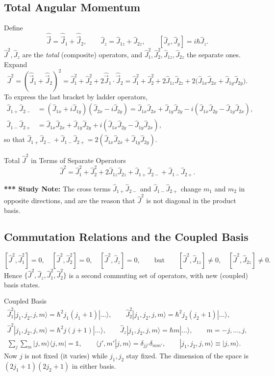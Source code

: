 \documentclass[11pt,a4paper]{article}
\begin{document}
\subsection{Total Angular Momentum}
Define
\[
\hat{\vec J}=\hat{\vec J}_1+\hat{\vec J}_2,\qquad \hat J_z=\hat J_{1z}+\hat J_{2z},\qquad [\hat J_x,\hat J_y]=i\hbar\hat J_z .
\]
$\hat J^2,\hat J_z$ are the \emph{total} (composite) operators, and $\hat J_1^2,\hat J_2^2,\hat J_{1z},\hat J_{2z}$ the separate ones. Expand
\[
\hat J^2=(\hat{\vec J}_1+\hat{\vec J}_2)^2=\hat J_1^2+\hat J_2^2+2\hat{\vec J}_1\cdot\hat{\vec J}_2=\hat J_1^2+\hat J_2^2+2\hat J_{1z}\hat J_{2z}+2\big(\hat J_{1x}\hat J_{2x}+\hat J_{1y}\hat J_{2y}\big).
\]
To express the last bracket by ladder operators,
\begin{align*}
\hat J_{1+}\hat J_{2-}&=(\hat J_{1x}+i\hat J_{1y})(\hat J_{2x}-i\hat J_{2y})=\hat J_{1x}\hat J_{2x}+\hat J_{1y}\hat J_{2y}-i(\hat J_{1x}\hat J_{2y}-\hat J_{1y}\hat J_{2x}),\\
\hat J_{1-}\hat J_{2+}&=\hat J_{1x}\hat J_{2x}+\hat J_{1y}\hat J_{2y}+i(\hat J_{1x}\hat J_{2y}-\hat J_{1y}\hat J_{2x}),
\end{align*}
so that $\hat J_{1+}\hat J_{2-}+\hat J_{1-}\hat J_{2+}=2(\hat J_{1x}\hat J_{2x}+\hat J_{1y}\hat J_{2y})$.

\begin{thm}{Total $\hat J^2$ in Terms of Separate Operators}
\[
\hat J^2=\hat J_1^2+\hat J_2^2+2\hat J_{1z}\hat J_{2z}+\hat J_{1+}\hat J_{2-}+\hat J_{1-}\hat J_{2+}.
\]
\end{thm}

\textbf{*** Study Note:} The cross terms $\hat J_{1+}\hat J_{2-}$ and $\hat J_{1-}\hat J_{2+}$ change $m_1$ and $m_2$ in opposite directions, and are the reason that $\hat J^2$ is not diagonal in the product basis.

\subsection{Commutation Relations and the Coupled Basis}
\[
[\hat J^2,\hat J_1^2]=0,\quad[\hat J^2,\hat J_2^2]=0,\quad[\hat J^2,\hat J_z]=0,\qquad\text{but}\qquad [\hat J^2,\hat J_{1z}]\neq0,\quad[\hat J^2,\hat J_{2z}]\neq0 .
\]
Hence $\{\hat J^2,\hat J_z,\hat J_1^2,\hat J_2^2\}$ is a second commuting set of operators, with new (coupled) basis states.

\begin{thm}{Coupled Basis}
\begin{gather*}
\hat J_1^2|j_1,j_2,j,m\rangle=\hbar^2j_1(j_1+1)|\dots\rangle,\qquad \hat J_2^2|j_1,j_2,j,m\rangle=\hbar^2j_2(j_2+1)|\dots\rangle,\\
\hat J^2|j_1,j_2,j,m\rangle=\hbar^2j(j+1)|\dots\rangle,\qquad \hat J_z|j_1,j_2,j,m\rangle=\hbar m|\dots\rangle,\qquad m=-j,\dots,j,\\
\sum_j\sum_m|j,m\rangle\langle j,m|=\mathbb 1,\qquad \langle j',m'|j,m\rangle=\delta_{jj'}\delta_{mm'},\qquad |j_1,j_2,j,m\rangle\equiv|j,m\rangle .
\end{gather*}
Now $j$ is not fixed (it varies) while $j_1,j_2$ stay fixed. The dimension of the space is $(2j_1+1)(2j_2+1)$ in either basis.
\end{thm}
\end{document}
